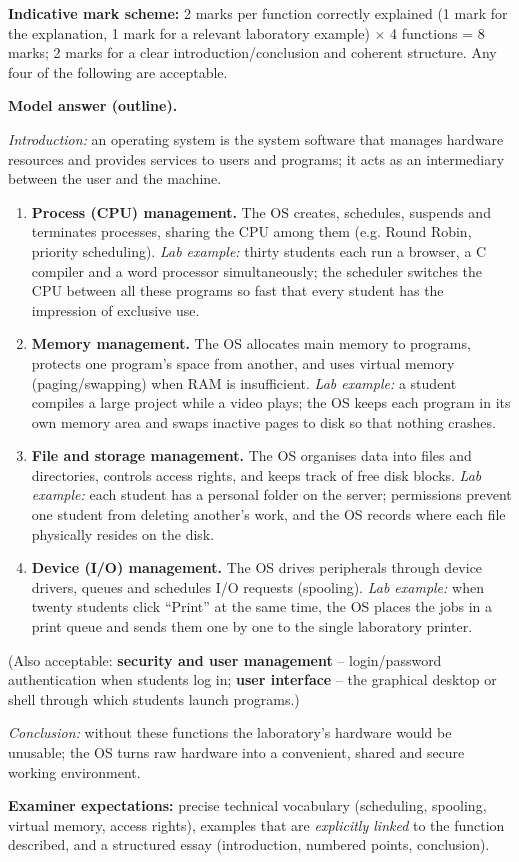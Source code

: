 \documentclass[11pt]{article}
\newcounter{popsec}
\newcounter{popsub}
\newcommand{\courssub}[1]{%
  \stepcounter{popsub}%
  \par\vspace{9pt}\noindent{\popxbold\fontsize{11.5}{13}\selectfont\color{popink}{\color{poporange}\thepopsec.\thepopsub}\hspace{6pt}#1}\par\nopagebreak\vspace{4pt}
}
\begin{document}
\courssub{Hands-on Projects}

\begin{corrige}
\textbf{Indicative mark scheme:} 2 marks per function correctly explained (1 mark for the explanation, 1 mark for a relevant laboratory example) $\times$ 4 functions = 8 marks; 2 marks for a clear introduction/conclusion and coherent structure. Any four of the following are acceptable.

\textbf{Model answer (outline).}

\emph{Introduction:} an operating system is the system software that manages hardware resources and provides services to users and programs; it acts as an intermediary between the user and the machine.

\begin{enumerate}
\item \textbf{Process (CPU) management.} The OS creates, schedules, suspends and terminates processes, sharing the CPU among them (e.g. Round Robin, priority scheduling). \emph{Lab example:} thirty students each run a browser, a C compiler and a word processor simultaneously; the scheduler switches the CPU between all these programs so fast that every student has the impression of exclusive use.
\item \textbf{Memory management.} The OS allocates main memory to programs, protects one program's space from another, and uses virtual memory (paging/swapping) when RAM is insufficient. \emph{Lab example:} a student compiles a large project while a video plays; the OS keeps each program in its own memory area and swaps inactive pages to disk so that nothing crashes.
\item \textbf{File and storage management.} The OS organises data into files and directories, controls access rights, and keeps track of free disk blocks. \emph{Lab example:} each student has a personal folder on the server; permissions prevent one student from deleting another's work, and the OS records where each file physically resides on the disk.
\item \textbf{Device (I/O) management.} The OS drives peripherals through device drivers, queues and schedules I/O requests (spooling). \emph{Lab example:} when twenty students click ``Print'' at the same time, the OS places the jobs in a print queue and sends them one by one to the single laboratory printer.
\end{enumerate}

(Also acceptable: \textbf{security and user management} -- login/password authentication when students log in; \textbf{user interface} -- the graphical desktop or shell through which students launch programs.)

\emph{Conclusion:} without these functions the laboratory's hardware would be unusable; the OS turns raw hardware into a convenient, shared and secure working environment.

\textbf{Examiner expectations:} precise technical vocabulary (scheduling, spooling, virtual memory, access rights), examples that are \emph{explicitly linked} to the function described, and a structured essay (introduction, numbered points, conclusion).
\end{corrige}
\end{document}
